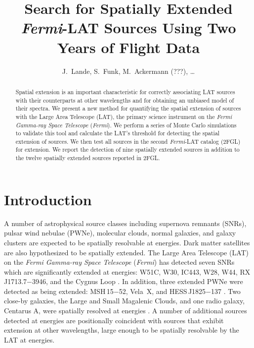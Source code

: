 \documentclass[12pt,preprint]{aastex}
\newcommand{\gev}{\text{GeV}\xspace}
\newcommand{\fermi}{\textit{Fermi}\xspace}
\begin{document}
\title{Search for Spatially Extended \fermi-LAT Sources Using Two Years of Flight
Data}


\author{
J.~Lande,
S.~Funk,
M.~Ackermann (???),
\ldots
{}
}


\begin{abstract}
Spatial extension is an important characteristic for correctly
associating LAT sources with their counterparts at other wavelengths
and for obtaining an unbiased model of their spectra.  We present a new
method for quantifying the spatial extension of sources with the Large
Area Telescope (LAT), the primary science instrument on the {\em \fermi
Gamma-ray Space Telescope} (\fermi).  We perform a series of Monte Carlo
simulations to validate this tool and calculate the LAT's threshold for
detecting the spatial extension of sources.  We then test all sources
in the second \fermi-LAT catalog (2FGL) for extension. We report the
detection of nine spatially extended sources in addition to the twelve
spatially extended sources reported in 2FGL.
\end{abstract}

\section{Introduction}


A number of astrophysical source classes including supernova remnants
(SNRs), pulsar wind nebulae (PWNe), molecular clouds, normal galaxies,
and galaxy clusters are expected to be spatially resolvable at
\gev energies.  Dark matter satellites are also hypothesized to
be spatially extended.  The Large Area Telescope
(LAT) on the {\em \fermi Gamma-ray Space Telescope} (\fermi) has
detected seven SNRs which are significantly extended
at \gev energies: 
W51C, W30, 
IC443, W28, W44, RX\,J1713.7$-$3946,
and the Cygnus Loop
\citep{w51c,castro_and_slane_2010,ic443,w28,w44,rx_j1713_lat,cygnus_loop_lat}. In addition, three extended
PWNe were detected as being extended: MSH\,15$-$52, Vela~X, and
HESS\,J1825$-$137 \citep{msh1552,velax,fermi_hess_j1825}. Two
close-by galaxies, the Large and Small Magalenic Clouds, and one
radio galaxy, Centarus A, were spatially resolved at \gev energies
\citep{lmc,smc,cen_a_lat}.  A number of additional sources detected
at \gev energies are positionally coincident with sources that exhibit
extension at other wavelengths, large enough to be spatially
resolvable by the LAT at \gev energies.
\end{document}
